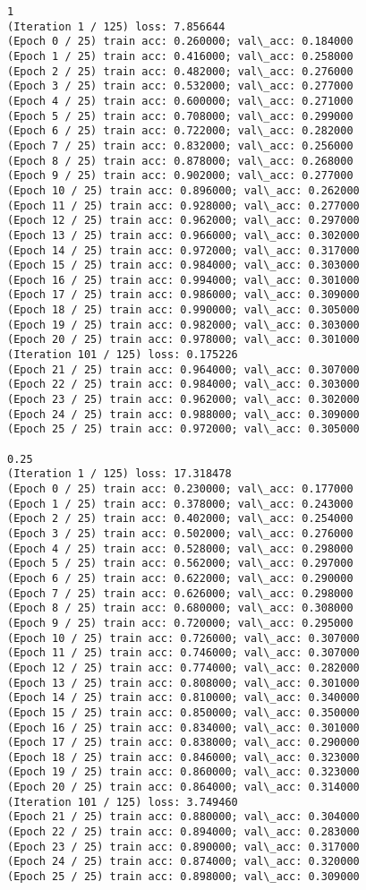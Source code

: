 \documentclass[11pt]{article}
\begin{document}
    \begin{Verbatim}[commandchars=\\\{\}]
1
(Iteration 1 / 125) loss: 7.856644
(Epoch 0 / 25) train acc: 0.260000; val\_acc: 0.184000
(Epoch 1 / 25) train acc: 0.416000; val\_acc: 0.258000
(Epoch 2 / 25) train acc: 0.482000; val\_acc: 0.276000
(Epoch 3 / 25) train acc: 0.532000; val\_acc: 0.277000
(Epoch 4 / 25) train acc: 0.600000; val\_acc: 0.271000
(Epoch 5 / 25) train acc: 0.708000; val\_acc: 0.299000
(Epoch 6 / 25) train acc: 0.722000; val\_acc: 0.282000
(Epoch 7 / 25) train acc: 0.832000; val\_acc: 0.256000
(Epoch 8 / 25) train acc: 0.878000; val\_acc: 0.268000
(Epoch 9 / 25) train acc: 0.902000; val\_acc: 0.277000
(Epoch 10 / 25) train acc: 0.896000; val\_acc: 0.262000
(Epoch 11 / 25) train acc: 0.928000; val\_acc: 0.277000
(Epoch 12 / 25) train acc: 0.962000; val\_acc: 0.297000
(Epoch 13 / 25) train acc: 0.966000; val\_acc: 0.302000
(Epoch 14 / 25) train acc: 0.972000; val\_acc: 0.317000
(Epoch 15 / 25) train acc: 0.984000; val\_acc: 0.303000
(Epoch 16 / 25) train acc: 0.994000; val\_acc: 0.301000
(Epoch 17 / 25) train acc: 0.986000; val\_acc: 0.309000
(Epoch 18 / 25) train acc: 0.990000; val\_acc: 0.305000
(Epoch 19 / 25) train acc: 0.982000; val\_acc: 0.303000
(Epoch 20 / 25) train acc: 0.978000; val\_acc: 0.301000
(Iteration 101 / 125) loss: 0.175226
(Epoch 21 / 25) train acc: 0.964000; val\_acc: 0.307000
(Epoch 22 / 25) train acc: 0.984000; val\_acc: 0.303000
(Epoch 23 / 25) train acc: 0.962000; val\_acc: 0.302000
(Epoch 24 / 25) train acc: 0.988000; val\_acc: 0.309000
(Epoch 25 / 25) train acc: 0.972000; val\_acc: 0.305000

0.25
(Iteration 1 / 125) loss: 17.318478
(Epoch 0 / 25) train acc: 0.230000; val\_acc: 0.177000
(Epoch 1 / 25) train acc: 0.378000; val\_acc: 0.243000
(Epoch 2 / 25) train acc: 0.402000; val\_acc: 0.254000
(Epoch 3 / 25) train acc: 0.502000; val\_acc: 0.276000
(Epoch 4 / 25) train acc: 0.528000; val\_acc: 0.298000
(Epoch 5 / 25) train acc: 0.562000; val\_acc: 0.297000
(Epoch 6 / 25) train acc: 0.622000; val\_acc: 0.290000
(Epoch 7 / 25) train acc: 0.626000; val\_acc: 0.298000
(Epoch 8 / 25) train acc: 0.680000; val\_acc: 0.308000
(Epoch 9 / 25) train acc: 0.720000; val\_acc: 0.295000
(Epoch 10 / 25) train acc: 0.726000; val\_acc: 0.307000
(Epoch 11 / 25) train acc: 0.746000; val\_acc: 0.307000
(Epoch 12 / 25) train acc: 0.774000; val\_acc: 0.282000
(Epoch 13 / 25) train acc: 0.808000; val\_acc: 0.301000
(Epoch 14 / 25) train acc: 0.810000; val\_acc: 0.340000
(Epoch 15 / 25) train acc: 0.850000; val\_acc: 0.350000
(Epoch 16 / 25) train acc: 0.834000; val\_acc: 0.301000
(Epoch 17 / 25) train acc: 0.838000; val\_acc: 0.290000
(Epoch 18 / 25) train acc: 0.846000; val\_acc: 0.323000
(Epoch 19 / 25) train acc: 0.860000; val\_acc: 0.323000
(Epoch 20 / 25) train acc: 0.864000; val\_acc: 0.314000
(Iteration 101 / 125) loss: 3.749460
(Epoch 21 / 25) train acc: 0.880000; val\_acc: 0.304000
(Epoch 22 / 25) train acc: 0.894000; val\_acc: 0.283000
(Epoch 23 / 25) train acc: 0.890000; val\_acc: 0.317000
(Epoch 24 / 25) train acc: 0.874000; val\_acc: 0.320000
(Epoch 25 / 25) train acc: 0.898000; val\_acc: 0.309000

    \end{Verbatim}
\end{document}
